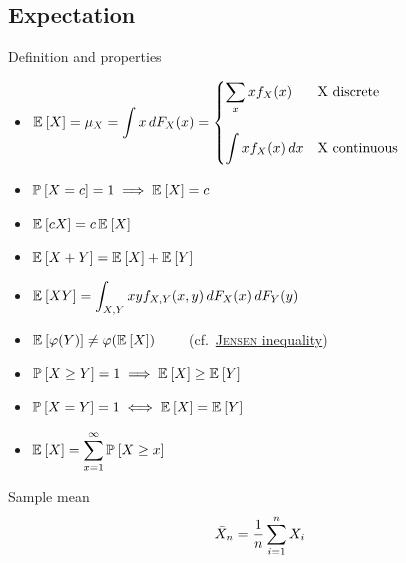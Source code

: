 \documentclass[landscape]{article}
\begin{document}
\begin{multicols*}{2}

\section{Expectation}

Definition and properties
\begin{itemize}
  \item $\E{X} = \mu_X = \displaystyle \int x \dfx =
    \begin{cases}
      \displaystyle\sum_x xf_X(x) & \text{X discrete} \\\\
      \displaystyle\int xf_X(x)\dx & \text{X continuous}
    \end{cases}$
  \item $\Pr{X=c}=1 \imp \E{X} = c$
  \item $\E{cX} = c\,\E{X}$
  \item $\E{X+Y} = \E{X}+\E{Y}$
  \item $\E{XY} = \displaystyle\int_{X,Y} xy f_{X,Y}(x,y)\dfx\dfy$
  \item $\E{\transform(Y)} \neq \transform(\E{X}) \qquad$
    (cf.~\hyperref[jensen]{\textsc{Jensen} inequality})
  \item $\Pr{X \ge Y} = 1 \imp \E{X}\ge\E{Y}$
  \item $\Pr{X=Y} = 1 \eqv \E{X}=\E{Y}$
  \item $\E{X} = \displaystyle\sum_{x=1}^\infty \Pr{X\ge x}$
\end{itemize}

Sample mean
\[\samplemean = \frac{1}{n}\sum_{i=1}^n X_i\]


\end{multicols*}
\end{document}
